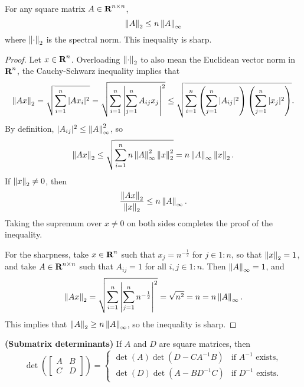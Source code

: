 \documentclass{article}
\begin{document}
	\begin{lem}
		\label{lem:chebyshev_estimate}
		For any square matrix $A \in \textnormal{\bf R}^{n\times n}$,
		\begin{equation}
			\left\lVert A \right\rVert_2 \le n\left\lVert A \right\rVert_\infty
		\end{equation}
		where $\left\lVert \cdot \right\rVert_2$ is the spectral norm. This inequality is sharp.
	\end{lem}
	
	\begin{proof}
		Let $x \in \textnormal{\bf R}^n$. Overloading $\left\lVert \cdot \right\rVert_2$ to also mean the Euclidean vector norm in $\textnormal{\bf R}^n$, the Cauchy-Schwarz inequality implies that
		\begin{equation}
			\left\lVert Ax \right\rVert_2 = \sqrt{\sum_{i=1}^n|Ax_i|^2} = \sqrt{\sum_{i=1}^n\left|\sum_{j=1}^nA_{ij}x_j\right|^2} \le \sqrt{\sum_{i=1}^n\left(\sum_{j=1}^n|A_{ij}|^2\right)\left(\sum_{j=1}^n|x_j|^2\right)}.
		\end{equation}
		By definition, $|A_{ij}|^2 \le \left\lVert A \right\rVert_\infty^2$, so
		\begin{equation}
			\left\lVert Ax \right\rVert_2 \le \sqrt{\sum_{i=1}^n n\left\lVert A \right\rVert_\infty^2\left\lVert x \right\rVert_2^2} = n\left\lVert A \right\rVert_\infty\left\lVert x \right\rVert_2.
		\end{equation}
		If $\left\lVert x \right\rVert_2 \ne 0$, then
		\begin{equation}
			\frac{\left\lVert Ax \right\rVert_2}{\left\lVert x \right\rVert_2} \le n\left\lVert A \right\rVert_\infty.
		\end{equation}
		Taking the supremum over $x \ne 0$ on both sides completes the proof of the inequality.
		
		For the sharpness, take $x\in \textnormal{\bf R}^n$ such that $x_j = n^{-\frac{1}{2}}$ for $j \in 1:n$, so that $\left\lVert x \right\rVert_2 = 1$, and take $A \in \textnormal{\bf R}^{n\times n}$ such that $A_{ij} = 1$ for all $i,j \in 1:n$. Then $\left\lVert A \right\rVert_\infty = 1$, and
		\begin{equation}
			\left\lVert Ax \right\rVert_2 = \sqrt{\sum_{i=1}^n\left|\sum_{j=1}^nn^{-\frac{1}{2}}\right|^2} = \sqrt{n^2} = n = n \left\lVert A \right\rVert_\infty.
		\end{equation}
		This implies that $\left\lVert A \right\rVert_2 \ge n\left\lVert A \right\rVert_\infty$, so the inequality is sharp.
	\end{proof}
	
	\begin{lem} \textnormal{\bf(Submatrix determinants)}
		\label{lem:submatrix_determinant}
		If $A$ and $D$ are square matrices, then
		\begin{equation}
			\det\left(\left[\begin{matrix}A & B \\ C & D\end{matrix}\right]\right) = \begin{cases}
				\det(A)\det(D-CA^{-1}B) & \text{if $A^{-1}$ exists}, \\
				\det(D)\det(A-BD^{-1}C) & \text{if $D^{-1}$ exists}.
			\end{cases}
		\end{equation}
	\end{lem}
	
\end{document}
